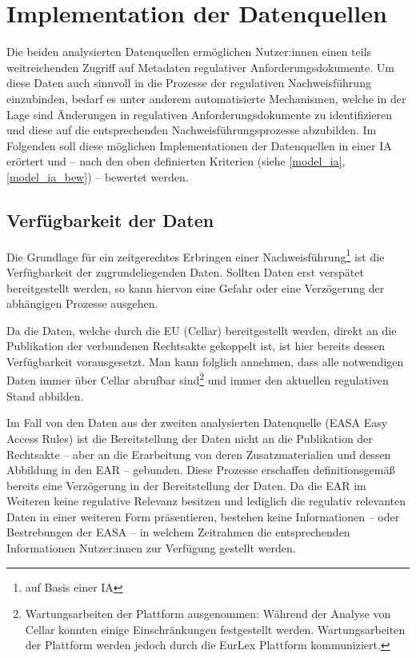 
\chapter{Implementation der Datenquellen} \label{anal}

    Die beiden analysierten Datenquellen ermöglichen Nutzer:innen einen teils weitreichenden Zugriff auf Metadaten regulativer Anforderungsdokumente.
    Um diese Daten auch sinnvoll in die Prozesse der regulativen Nachweisführung einzubinden, bedarf es unter anderem automatisierte Mechanismen, welche in der Lage sind Änderungen in regulativen Anforderungsdokumente zu identifizieren und diese auf die entsprechenden Nachweisführungsprozesse abzubilden.
    Im Folgenden soll diese möglichen Implementationen der Datenquellen in einer \acf{IA} erörtert und -- nach den oben definierten Kriterien (siehe \ref{model_ia}, \ref{model_ia_bew}) -- bewertet werden.

\section{Verfügbarkeit der Daten}

    Die Grundlage für ein zeitgerechtes Erbringen einer Nachweisführung\footnote{auf Basis einer \ac{IA}} ist die Verfügbarkeit der zugrundeliegenden Daten.
    Sollten Daten erst verspätet bereitgestellt werden, so kann hiervon eine Gefahr oder eine Verzögerung der abhängigen Prozesse ausgehen.

    \medskip
    Da die Daten, welche durch die \ac{EU} (Cellar) bereitgestellt werden, direkt an die Publikation der verbundenen Rechtsakte gekoppelt ist, ist hier bereits dessen Verfügbarkeit vorausgesetzt.
    Man kann folglich annehmen, dass alle notwendigen Daten immer über Cellar abrufbar sind\footnote{Wartungsarbeiten der Plattform ausgenommen: Während der Analyse von Cellar konnten einige Einschränkungen festgestellt werden. Wartungsarbeiten der Plattform werden jedoch durch die EurLex Plattform kommuniziert.} und immer den aktuellen regulativen Stand abbilden.

    \medskip
    Im Fall von den Daten aus der zweiten analysierten Datenquelle (\ac{EASA} Easy Access Rules) ist die Bereitstellung der Daten nicht an die Publikation der Rechtsakte -- aber an die Erarbeitung von deren Zusatzmaterialien und dessen Abbildung in den \ac{EAR} -- gebunden.
    Diese Prozesse erschaffen definitionsgemäß bereits eine Verzögerung in der Bereitstellung der Daten.
    Da die \ac{EAR} im Weiteren keine regulative Relevanz besitzen und lediglich die regulativ relevanten Daten in einer weiteren Form präsentieren, bestehen keine Informationen -- oder Bestrebungen der \ac{EASA} \cite{easa_xml_export} -- in welchem Zeitrahmen die entsprechenden Informationen Nutzer:innen zur Verfügung gestellt werden.    

